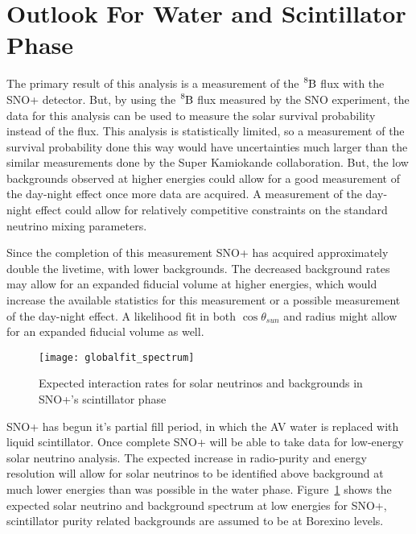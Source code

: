 \section{Outlook For Water and Scintillator Phase}
The primary result of this analysis is a measurement of the $\ce{^{8}B}$
flux with the SNO+ detector. 
But, by using the $\ce{^{8}B}$ flux measured by the SNO experiment, the data for
this analysis can be used to measure the solar survival probability instead
of the flux.
This analysis is statistically limited, so a measurement of the survival
probability done this way would have uncertainties much larger than the similar
measurements done by the Super Kamiokande collaboration.
But, the low backgrounds observed at higher energies could allow for a good measurement
of the day-night effect once more data are acquired.
A measurement of the day-night effect could allow for relatively
competitive constraints on the standard neutrino mixing parameters.

Since the completion of this measurement SNO+ has acquired approximately double
the livetime, with lower backgrounds.
The decreased background rates may allow for an expanded fiducial volume at
higher energies, which would increase the available statistics for this measurement
or a possible measurement of the day-night effect.
A likelihood fit in both $\cos\theta_{sun}$ and radius might allow for an
expanded fiducial volume as well.

\begin{figure}[htbp]
    \centering
    \texttt{[image: globalfit\_spectrum]}
    \caption[Expected Scintillator Phase SNO+ Solar Neutrino Spectrum]{Expected interaction
    rates for solar neutrinos and backgrounds in SNO+'s scintillator phase}
    \label{fig:snop_scintillator}
\end{figure}
SNO+ has begun it's partial fill
period, in which the AV  water is replaced with liquid scintillator.
Once complete SNO+ will be able to take data for low-energy solar neutrino
analysis.
The expected increase in radio-purity and energy resolution will allow
for solar neutrinos to be identified above background at much lower energies
than was possible in the water phase.
Figure~\ref{fig:snop_scintillator} shows the expected solar neutrino and
background spectrum at low energies for SNO+, scintillator purity related
backgrounds are assumed to be at Borexino levels.

